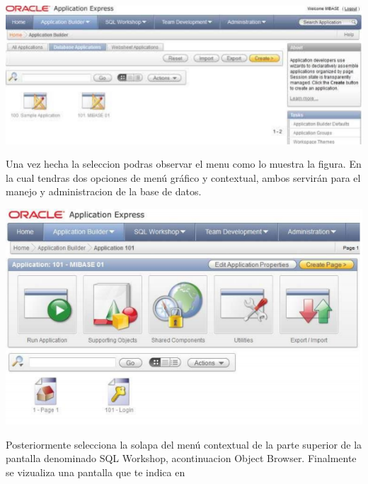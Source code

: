 \documentclass[12pt,letterpaper]{article}
\begin{document}
\begin{center}
\includegraphics[width=15cm]{./IMG/img14}
\end{center}
Una vez hecha la seleccion podras observar el menu como lo muestra la figura. En la cual tendras dos opciones de men\'u gr\'afico y contextual, ambos servir\'an
para el manejo y administracion de la base de datos.
\begin{center}
\includegraphics[width=15cm]{./IMG/img15}
\end{center}
Posteriormente selecciona la solapa del men\'u contextual de la parte superior de la
pantalla denominado SQL Workshop, acontinuacion Object Browser. Finalmente
se vizualiza una pantalla que te indica en 
\end{document}
